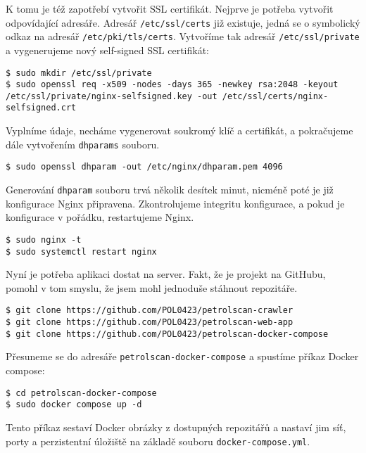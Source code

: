 K tomu je též zapotřebí vytvořit SSL certifikát. Nejprve je potřeba vytvořit
odpovídající adresáře. Adresář \texttt{/etc/ssl/certs} již existuje, jedná
se o symbolický odkaz na adresář \texttt{/etc/pki/tls/certs}.
Vytvoříme tak adresář \texttt{/etc/ssl/private} a vygenerujeme nový
self-signed SSL certifikát:

\begin{verbatim}
$ sudo mkdir /etc/ssl/private
$ sudo openssl req -x509 -nodes -days 365 -newkey rsa:2048 -keyout /etc/ssl/private/nginx-selfsigned.key -out /etc/ssl/certs/nginx-selfsigned.crt
\end{verbatim}

Vyplníme údaje, necháme vygenerovat soukromý klíč a certifikát, a pokračujeme
dále vytvořením \texttt{dhparams} souboru.



\begin{verbatim}
$ sudo openssl dhparam -out /etc/nginx/dhparam.pem 4096
\end{verbatim}

Generování \texttt{dhparam} souboru trvá několik desítek minut, nicméně
poté je již konfigurace Nginx připravena. Zkontrolujeme integritu
konfigurace, a pokud je konfigurace v pořádku, restartujeme Nginx.

\begin{verbatim}
$ sudo nginx -t
$ sudo systemctl restart nginx
\end{verbatim}

Nyní je potřeba aplikaci dostat na server. Fakt, že je projekt na GitHubu,
pomohl v tom smyslu, že jsem mohl jednoduše stáhnout repozitáře.

\begin{verbatim}
$ git clone https://github.com/POL0423/petrolscan-crawler
$ git clone https://github.com/POL0423/petrolscan-web-app
$ git clone https://github.com/POL0423/petrolscan-docker-compose
\end{verbatim}

Přesuneme se do adresáře \texttt{petrolscan-docker-compose} a spustíme
příkaz Docker compose:

\begin{verbatim}
$ cd petrolscan-docker-compose
$ sudo docker compose up -d
\end{verbatim}

Tento příkaz sestaví Docker obrázky z dostupných repozitářů a nastaví
jim síť, porty a perzistentní úložiště na základě souboru
\texttt{docker-compose.yml}.

